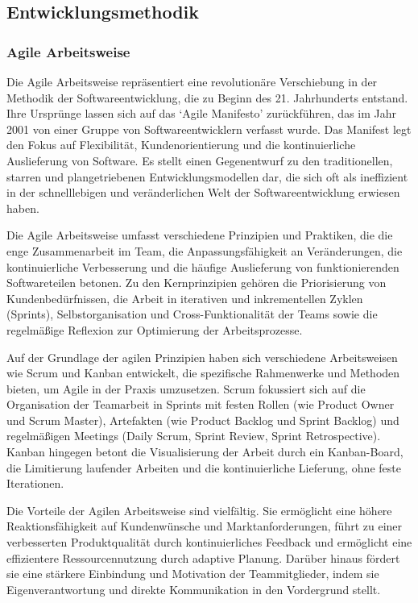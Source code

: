 \documentclass[../main.tex]{subfiles} %
\begin{document}
\subsection{Entwicklungsmethodik} %

\subsubsection{Agile Arbeitsweise}

Die Agile Arbeitsweise repräsentiert eine revolutionäre Verschiebung in der Methodik der Softwareentwicklung, die zu Beginn des 21.
Jahrhunderts entstand. Ihre Ursprünge lassen sich auf das `Agile Manifesto' zurückführen, das im Jahr 2001 von einer Gruppe von
Softwareentwicklern verfasst wurde. Das Manifest legt den Fokus auf Flexibilität, Kundenorientierung und die kontinuierliche Auslieferung
von Software. Es stellt einen Gegenentwurf zu den traditionellen, starren und plangetriebenen Entwicklungsmodellen dar, die sich oft als
ineffizient in der schnelllebigen und veränderlichen Welt der Softwareentwicklung erwiesen haben.

Die Agile Arbeitsweise umfasst verschiedene Prinzipien und Praktiken, die die enge Zusammenarbeit im Team, die Anpassungsfähigkeit an
Veränderungen, die kontinuierliche Verbesserung und die häufige Auslieferung von funktionierenden Softwareteilen betonen. Zu den
Kernprinzipien gehören die Priorisierung von Kundenbedürfnissen, die Arbeit in iterativen und inkrementellen Zyklen (Sprints),
Selbstorganisation und Cross-Funktionalität der Teams sowie die regelmäßige Reflexion zur Optimierung der Arbeitsprozesse.

Auf der Grundlage der agilen Prinzipien haben sich verschiedene Arbeitsweisen wie Scrum und Kanban entwickelt, die spezifische
Rahmenwerke und Methoden bieten, um Agile in der Praxis umzusetzen. Scrum fokussiert sich auf die Organisation der Teamarbeit in
Sprints mit festen Rollen (wie Product Owner und Scrum Master), Artefakten (wie Product Backlog und Sprint Backlog) und regelmäßigen
Meetings (Daily Scrum, Sprint Review, Sprint Retrospective). Kanban hingegen betont die Visualisierung der Arbeit durch ein Kanban-Board,
die Limitierung laufender Arbeiten und die kontinuierliche Lieferung, ohne feste Iterationen.

Die Vorteile der Agilen Arbeitsweise sind vielfältig. Sie ermöglicht eine höhere Reaktionsfähigkeit auf Kundenwünsche und Marktanforderungen,
führt zu einer verbesserten Produktqualität durch kontinuierliches Feedback und ermöglicht eine effizientere Ressourcennutzung durch adaptive
Planung. Darüber hinaus fördert sie eine stärkere Einbindung und Motivation der Teammitglieder, indem sie Eigenverantwortung und direkte
Kommunikation in den Vordergrund stellt.
\end{document}
